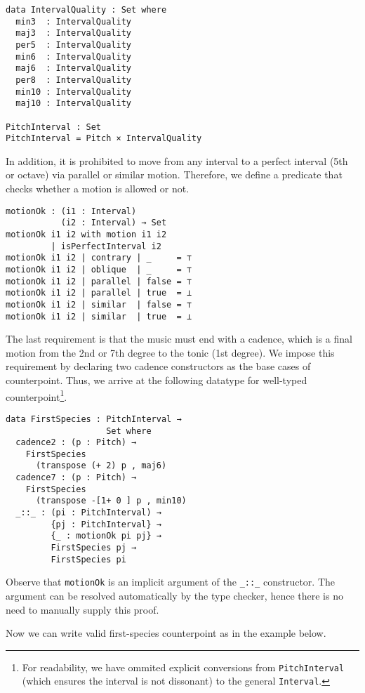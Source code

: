 \documentclass[sigplan,review]{acmart}\settopmatter{printfolios=true,printccs=false,printacmref=false}
\begin{document}
\begin{lstlisting}
data IntervalQuality : Set where
  min3  : IntervalQuality
  maj3  : IntervalQuality
  per5  : IntervalQuality
  min6  : IntervalQuality
  maj6  : IntervalQuality
  per8  : IntervalQuality
  min10 : IntervalQuality
  maj10 : IntervalQuality

PitchInterval : Set
PitchInterval = Pitch × IntervalQuality
\end{lstlisting}

In addition, it is prohibited to move from any interval to
a perfect interval (5th or octave) via parallel or similar motion.
Therefore, we define a predicate that checks whether a motion 
is allowed or not.

\begin{lstlisting}
motionOk : (i1 : Interval)
           (i2 : Interval) → Set
motionOk i1 i2 with motion i1 i2
         | isPerfectInterval i2
motionOk i1 i2 | contrary | _     = ⊤
motionOk i1 i2 | oblique  | _     = ⊤
motionOk i1 i2 | parallel | false = ⊤
motionOk i1 i2 | parallel | true  = ⊥
motionOk i1 i2 | similar  | false = ⊤
motionOk i1 i2 | similar  | true  = ⊥
\end{lstlisting}

The last requirement is that the music must end with a cadence,
 which is a final motion from the 2nd or 7th degree to the tonic 
(1st degree). 
We impose this requirement by declaring two cadence constructors 
as the base cases of counterpoint.
Thus, we arrive at the following datatype for well-typed counterpoint\footnote{
For readability, we have ommited explicit conversions 
from \texttt{PitchInterval} (which ensures the interval is not dissonant) 
to the general \texttt{Interval}.}.

\begin{lstlisting}
data FirstSpecies : PitchInterval →
                    Set where
  cadence2 : (p : Pitch) →
    FirstSpecies
      (transpose (+ 2) p , maj6)
  cadence7 : (p : Pitch) →
    FirstSpecies
      (transpose -[1+ 0 ] p , min10)
  _::_ : (pi : PitchInterval) →
         {pj : PitchInterval} →
         {_ : motionOk pi pj} →
         FirstSpecies pj →
         FirstSpecies pi
\end{lstlisting}

\noindent Observe that \texttt{motionOk} is an implicit argument of 
the \texttt{\_::\_} constructor. 
The argument can be resolved automatically by the type checker,
hence there is no need to manually supply this proof. 

Now we can write valid first-species counterpoint as in the 
example below.
\end{document}
